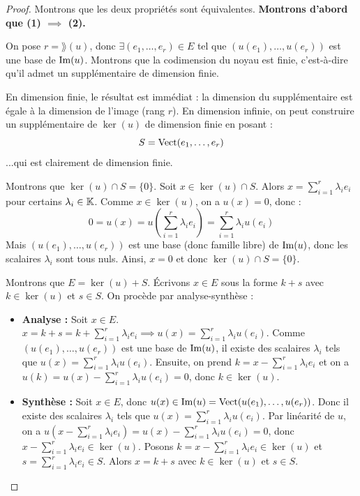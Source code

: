 \documentclass[11pt,a4paper]{report}
\begin{document}
\begin{proof}
    Montrons que les deux propriétés sont équivalentes. \textbf{Montrons d'abord que (1) $\implies$ (2).}

    On pose $r = \rang(u)$, donc $\exists(e_1,\dots,e_r)\in E$ tel que $(u(e_1),\dots,u(e_r))$ est une base de $\mathrm{Im}(u)$. Montrons que la codimension du noyau est finie, c'est-à-dire qu'il admet un supplémentaire de dimension finie.

    En dimension finie, le résultat est immédiat : la dimension du supplémentaire est égale à la dimension de l'image (rang $r$). En dimension infinie, on peut construire un supplémentaire de $\ker(u)$ de dimension finie en posant :
    $$S = \mathrm{Vect}(e_1,\dots,e_r)$$
    ...qui est clairement de dimension finie.

    Montrons que $\ker(u) \cap S = \{0\}$. Soit $x \in \ker(u) \cap S$. Alors $x = \sum_{i=1}^r \lambda_i e_i$ pour certains $\lambda_i \in \mathbb{K}$. Comme $x \in \ker(u)$, on a $u(x) = 0$, donc :
    $$0 = u(x) = u\left(\sum_{i=1}^r \lambda_i e_i\right) = \sum_{i=1}^r \lambda_i u(e_i)$$
    Mais $(u(e_1),\dots,u(e_r))$ est une base (donc famille libre) de $\mathrm{Im}(u)$, donc les scalaires $\lambda_i$ sont tous nuls. Ainsi, $x = 0$ et donc $\ker(u) \cap S = \{0\}$.
    
    Montrons que $E = \ker(u) + S$. Écrivons $x \in E$ sous la forme $k + s$ avec $k \in \ker(u)$ et $s \in S$. On procède par analyse-synthèse :
    \begin{itemize}
        \item \textbf{Analyse :} Soit $x \in E$. $x = k+s =  k + \sum_{i=1}^r\lambda_i e_i \implies u(x) = \sum_{i=1}^r\lambda_i u(e_i)$. Comme $(u(e_1),\dots,u(e_r))$ est une base de $\mathrm{Im}(u)$, il existe des scalaires $\lambda_i$ tels que $u(x) = \sum_{i=1}^r\lambda_i u(e_i)$. Ensuite, on prend $k = x - \sum_{i=1}^r\lambda_i e_i$ et on a $u(k) = u(x) - \sum_{i=1}^r\lambda_i u(e_i) = 0$, donc $k \in \ker(u)$.
        \item \textbf{Synthèse :} Soit $x \in E$, donc $u(x) \in \mathrm{Im}(u) = \mathrm{Vect}(u(e_1),\dots,u(e_r))$. Donc il existe des scalaires $\lambda_i$ tels que $u(x) = \sum_{i=1}^r\lambda_i u(e_i)$. Par linéarité de $u$, on a $u(x - \sum_{i=1}^r\lambda_i e_i) = u(x) - \sum_{i=1}^r\lambda_i u(e_i) = 0$, donc $x - \sum_{i=1}^r\lambda_i e_i \in \ker(u)$. Posons $k = x - \sum_{i=1}^r\lambda_i e_i \in \ker(u)$ et $s = \sum_{i=1}^r\lambda_i e_i \in S$. Alors $x = k + s$ avec $k \in \ker(u)$ et $s \in S$.
    \end{itemize}



\end{proof}
\end{document}
